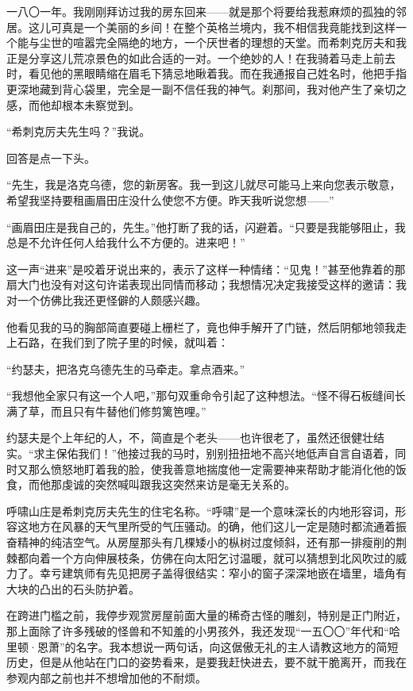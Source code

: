 \par 一八〇一年。我刚刚拜访过我的房东回来——就是那个将要给我惹麻烦的孤独的邻居。这儿可真是一个美丽的乡间！在整个英格兰境内，我不相信我竟能找到这样一个能与尘世的喧嚣完全隔绝的地方，一个厌世者的理想的天堂。而希刺克厉夫和我正是分享这儿荒凉景色的如此合适的一对。一个绝妙的人！在我骑着马走上前去时，看见他的黑眼睛缩在眉毛下猜忌地瞅着我。而在我通报自己姓名时，他把手指更深地藏到背心袋里，完全是一副不信任我的神气。刹那间，我对他产生了亲切之感，而他却根本未察觉到。
\par “希刺克厉夫先生吗？”我说。
\par 回答是点一下头。
\par “先生，我是洛克乌德，您的新房客。我一到这儿就尽可能马上来向您表示敬意，希望我坚持要租画眉田庄没什么使您不方便。昨天我听说您想——”
\par “画眉田庄是我自己的，先生。”他打断了我的话，闪避着。“只要是我能够阻止，我总是不允许任何人给我什么不方便的。进来吧！”
\par 这一声“进来”是咬着牙说出来的，表示了这样一种情绪：“见鬼！”甚至他靠着的那扇大门也没有对这句许诺表现出同情而移动；我想情况决定我接受这样的邀请：我对一个仿佛比我还更怪僻的人颇感兴趣。
\par 他看见我的马的胸部简直要碰上栅栏了，竟也伸手解开了门链，然后阴郁地领我走上石路，在我们到了院子里的时候，就叫着：
\par “约瑟夫，把洛克乌德先生的马牵走。拿点酒来。”
\par “我想他全家只有这一个人吧，”那句双重命令引起了这种想法。“怪不得石板缝间长满了草，而且只有牛替他们修剪篱笆哩。”
\par 约瑟夫是个上年纪的人，不，简直是个老头——也许很老了，虽然还很健壮结实。“求主保佑我们！”他接过我的马时，别别扭扭地不高兴地低声自言自语着，同时又那么愤怒地盯着我的脸，使我善意地揣度他一定需要神来帮助才能消化他的饭食，而他那虔诚的突然喊叫跟我这突然来访是毫无关系的。
\par 呼啸山庄是希刺克厉夫先生的住宅名称。“呼啸”是一个意味深长的内地形容词，形容这地方在风暴的天气里所受的气压骚动。的确，他们这儿一定是随时都流通着振奋精神的纯洁空气。从房屋那头有几棵矮小的枞树过度倾斜，还有那一排瘦削的荆棘都向着一个方向伸展枝条，仿佛在向太阳乞讨温暖，就可以猜想到北风吹过的威力了。幸亏建筑师有先见把房子盖得很结实：窄小的窗子深深地嵌在墙里，墙角有大块的凸出的石头防护着。
\par 在跨进门槛之前，我停步观赏房屋前面大量的稀奇古怪的雕刻，特别是正门附近，那上面除了许多残破的怪兽和不知羞的小男孩外，我还发现“一五〇〇”年代和“哈里顿·恩萧”的名字。我本想说一两句话，向这倨傲无礼的主人请教这地方的简短历史，但是从他站在门口的姿势看来，是要我赶快进去，要不就干脆离开，而我在参观内部之前也并不想增加他的不耐烦。
